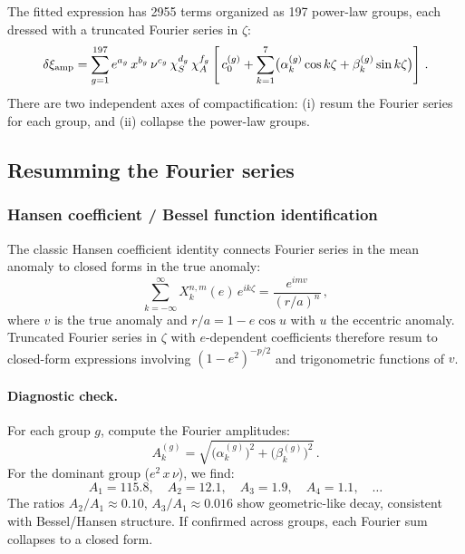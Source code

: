 \documentclass[11pt,letterpaper]{article}
\newcommand{\dxamp}{\delta\xi_{\rm amp}}
\newcommand{\chiS}{\chi_S}
\newcommand{\chiA}{\chi_A}
\begin{document}
The fitted expression has 2955 terms organized as 197 power-law groups, each dressed with a truncated Fourier series in $\zeta$:
\begin{equation}
\dxamp = \sum_{g=1}^{197} e^{a_g}\, x^{b_g}\, \nu^{c_g}\, \chiS^{d_g}\, \chiA^{f_g} \left[\, c_0^{(g)} + \sum_{k=1}^{7} \bigl(\alpha_k^{(g)} \cos k\zeta + \beta_k^{(g)} \sin k\zeta\bigr) \right]\,.
\end{equation}
There are two independent axes of compactification: (i) resum the Fourier series for each group, and (ii) collapse the power-law groups.

\subsection{Resumming the Fourier series}

\subsubsection{Hansen coefficient / Bessel function identification}

The classic Hansen coefficient identity connects Fourier series in the mean anomaly to closed forms in the true anomaly:
\begin{equation}
\sum_{k=-\infty}^{\infty} X_k^{n,m}(e)\, e^{ik\zeta} = \frac{e^{imv}}{(r/a)^n}\,,
\label{eq:hansen}
\end{equation}
where $v$ is the true anomaly and $r/a = 1 - e\cos u$ with $u$ the eccentric anomaly. Truncated Fourier series in $\zeta$ with $e$-dependent coefficients therefore resum to closed-form expressions involving $(1-e^2)^{-p/2}$ and trigonometric functions of $v$.

\paragraph{Diagnostic check.} For each group $g$, compute the Fourier amplitudes:
\begin{equation}
A_k^{(g)} = \sqrt{\bigl(\alpha_k^{(g)}\bigr)^2 + \bigl(\beta_k^{(g)}\bigr)^2}\,.
\end{equation}
For the dominant group ($e^2\, x\, \nu$), we find:
\begin{equation}
A_1 = 115.8, \quad A_2 = 12.1, \quad A_3 = 1.9, \quad A_4 = 1.1, \quad \ldots
\end{equation}
The ratios $A_2/A_1 \approx 0.10$, $A_3/A_1 \approx 0.016$ show geometric-like decay, consistent with Bessel/Hansen structure. If confirmed across groups, each Fourier sum collapses to a closed form.
\end{document}
